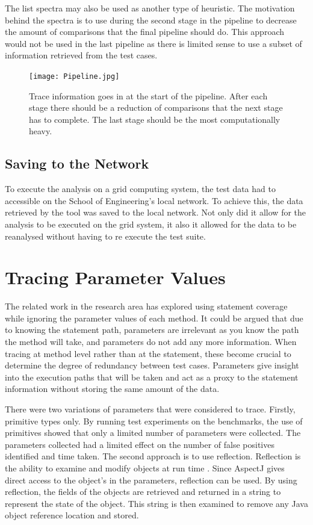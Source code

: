 The list spectra may also be used as another type of heuristic. The motivation behind the spectra is to use during the second stage in the pipeline to decrease the amount of comparisons that the final pipeline should do. This approach would not be used in the last pipeline as there is limited sense to use a subset of information retrieved from the test cases.

\begin{figure}[h]
\texttt{[image: Pipeline.jpg]}
\caption{Trace information goes in at the start of the pipeline. After each stage there should be a reduction of comparisons that the next stage has to complete. The last stage should be the most computationally heavy.}
\label{fig:pipeline}
\end{figure}

\subsection{Saving to the Network}
To execute the analysis on a grid computing system, the test data had to accessible on the School of Engineering's local network. To achieve this, the data retrieved by the tool was saved to the local network. Not only did it allow for the analysis to be executed on the grid system, it also it allowed for the data to be reanalysed without having to re execute the test suite. 

\section{Tracing Parameter Values}
\label{parameterTrace}
The related work in the research area has explored using statement coverage while ignoring the parameter values of each method. It could be argued that due to knowing the statement path, parameters are irrelevant as you know the path the method will take, and parameters do not add any more information. When tracing at method level rather than at the statement, these become crucial to determine the degree of redundancy between test cases. Parameters give insight into the execution paths that will be taken and act as a proxy to the statement information without storing the same amount of the data.

There were two variations of parameters that were considered to trace. Firstly, primitive types only. By running test experiments on the benchmarks, the use of primitives showed that only a limited number of parameters were collected. The parameters collected had a limited effect on the number of false positives identified and time taken. The second approach is to use reflection. Reflection is the ability to examine and modify objects at run time \cite{oraclereflection}. Since AspectJ gives direct access to the object's in the parameters, reflection can be used. By using reflection, the fields of the objects are retrieved and returned in a string to represent the state of the object. This string is then examined to remove any Java object reference location and stored.

